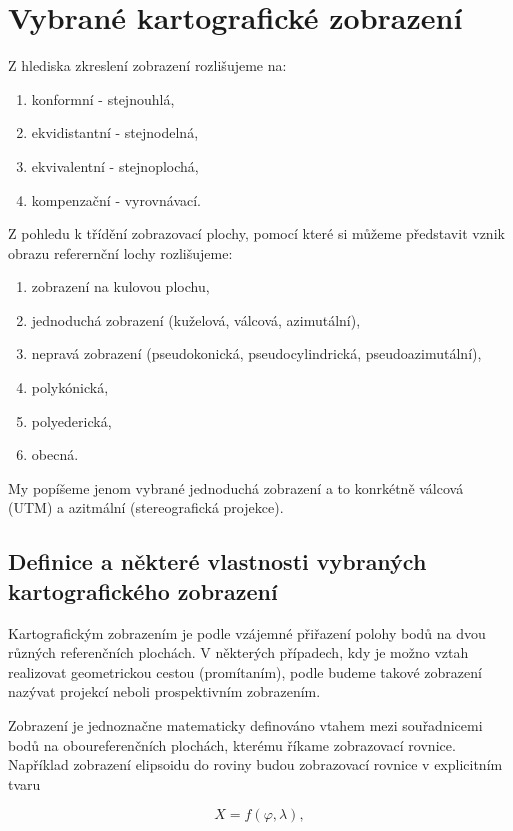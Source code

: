
\section{Vybrané kartografické zobrazení}

Z hlediska zkreslení zobrazení rozlišujeme na:
\begin{enumerate}
\item konformní - stejnouhlá,
\item ekvidistantní - stejnodelná,
\item ekvivalentní - stejnoplochá,
\item kompenzační - vyrovnávací.
\end{enumerate}

Z pohledu k třídění zobrazovací plochy, pomocí které si můžeme představit vznik obrazu referernční lochy rozlišujeme:
\begin{enumerate}
\item zobrazení na kulovou plochu,
\item jednoduchá zobrazení (kuželová, válcová, azimutální),
\item nepravá zobrazení (pseudokonická, pseudocylindrická, pseudoazimutální),
\item polykónická,
\item polyederická, 
\item obecná.
\end{enumerate}
My popíšeme jenom vybrané jednoduchá zobrazení a to konrkétně válcová (UTM) a azitmální (stereografická projekce).

\subsection{Definice a některé vlastnosti vybraných kartografického zobrazení}

Kartografickým zobrazením je podle \cite{Buchar2002} vzájemné přiřazení polohy bodů na dvou různých referenčních plochách. V některých případech, kdy je možno vztah realizovat geometrickou cestou (promítaním), podle \cite{Buchar2002} budeme takové zobrazení nazývat projekcí neboli prospektivním zobrazením.

Zobrazení je jednoznačne matematicky definováno vtahem mezi souřadnicemi bodů na oboureferenčních plochách, kterému říkame zobrazovací rovnice. Například zobrazení elipsoidu do roviny budou zobrazovací rovnice v explicitním tvaru

\begin{equation}
X = f\left(\varphi, \lambda\right),
\end{equation}


